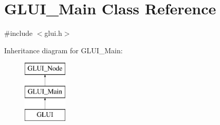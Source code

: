 \hypertarget{classGLUI__Main}{\section{G\-L\-U\-I\-\_\-\-Main Class Reference}
\label{classGLUI__Main}
}


{\ttfamily \#include $<$glui.\-h$>$}

Inheritance diagram for G\-L\-U\-I\-\_\-\-Main\-:\begin{figure}[H]
\begin{center}
\leavevmode
\includegraphics[height=3.000000cm]{classGLUI__Main}
\end{center}
\end{figure}

